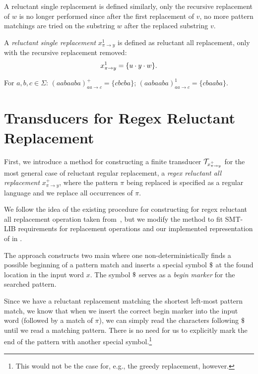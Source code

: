 A reluctant single replacement is defined similarly, only the recursive replacement of $w$ is no longer performed since after the first replacement of $v$, no more pattern matchings are tried on the substring $w$ after the replaced substring $v$.
\begin{definition} \hfill \newline
  A \emph{reluctant single replacement} $x^{1}_{\pi \rightarrow y}$ is defined as reluctant all replacement, only with the recursive replacement removed:
  $$x^{1}_{\pi \rightarrow y} = \{ u \cdot y \cdot w \} \text{.}$$
\end{definition}

\begin{example}
  For $a, b, c \in \Sigma$: $(aabaaba)^{+}_{aa \rightarrow c} = \{ cbcba \}$; $(aabaaba)^{1}_{aa \rightarrow c} = \{ cbaaba \}$.
\end{example}

\section{Transducers for Regex Reluctant Replacement}

First, we introduce a method for constructing a finite transducer $\mathcal{T}_{x^{+}_{\pi \rightarrow y}}$ for the most general case of reluctant regular replacement, a \emph{regex reluctant all replacement} $x^{+}_{\pi \rightarrow y}$, where the pattern $\pi$ being replaced is specified as a regular language and we replace all occurrences of $\pi$.

We follow the idea of the existing procedure for constructing \nft for regex reluctant all replacement operation taken from~\cite{replace_nfts_model_ModelingRegularReplacementForStringConstraintSolving_DBLP:conf/nfm/FuL10}, but we modify the method to fit SMT-LIB requirements for replacement operations and our implemented representation of \nfts in \mata.

The approach constructs two main \nfts where one non-deterministically finds a possible beginning of a pattern match and inserts a special symbol $\marker$ at the found location in the input word $x$. The symbol $\marker$ serves as a \emph{begin marker} for the searched pattern.

Since we have a reluctant replacement matching the shortest left-most pattern match, we know that when we insert the correct begin marker into the input word (followed by a match of $\pi$), we can simply read the characters following $\marker$ until we read a matching pattern. There is no need for us to explicitly mark the end of the pattern with another special symbol.\footnote{
  This would not be the case for, e.g., the greedy replacement, however.
}

